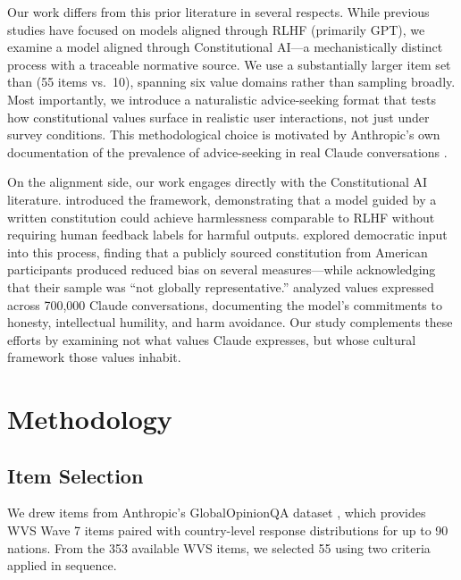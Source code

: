 \documentclass{article}
\begin{document}
Our work differs from this prior literature in several respects. While previous studies have focused on models aligned through RLHF (primarily GPT), we examine a model aligned through Constitutional AI---a mechanistically distinct process with a traceable normative source. We use a substantially larger item set than \citet{tao2024cultural} (55 items vs.\ 10), spanning six value domains rather than sampling broadly. Most importantly, we introduce a naturalistic advice-seeking format that tests how constitutional values surface in realistic user interactions, not just under survey conditions. This methodological choice is motivated by Anthropic's own documentation of the prevalence of advice-seeking in real Claude conversations \citep{anthropic2025values}.

On the alignment side, our work engages directly with the Constitutional AI literature. \citet{bai2022constitutional} introduced the framework, demonstrating that a model guided by a written constitution could achieve harmlessness comparable to RLHF without requiring human feedback labels for harmful outputs. \citet{huang2024collective} explored democratic input into this process, finding that a publicly sourced constitution from American participants produced reduced bias on several measures---while acknowledging that their sample was ``not globally representative.'' \citet{anthropic2025values} analyzed values expressed across 700,000 Claude conversations, documenting the model's commitments to honesty, intellectual humility, and harm avoidance. Our study complements these efforts by examining not what values Claude expresses, but whose cultural framework those values inhabit.

\section{Methodology}

\subsection{Item Selection}

We drew items from Anthropic's GlobalOpinionQA dataset \citep{durmus2023measuring}, which provides WVS Wave 7 \citep{haerpfer2022world} items paired with country-level response distributions for up to 90 nations. From the 353 available WVS items, we selected 55 using two criteria applied in sequence.
\end{document}
